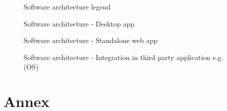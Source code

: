 \documentclass[letterpaper,10pt, openany,english]{sphinxmanual}
\begin{document}

\begin{figure}[htbp]
\centering
\capstart

\noindent{}
\caption{Software architecture legend}\label{\detokenize{architecture:linkage-architecture-legend}}\end{figure}

\begin{figure}[htbp]
\centering
\capstart

\noindent{}
\caption{Software architecture - Desktop app}\label{\detokenize{architecture:linkage-architecture}}\end{figure}

\begin{figure}[htbp]
\centering
\capstart

\noindent{}
\caption{Software architecture - Standalone web app}\label{\detokenize{architecture:linkage-architecture-spa}}\end{figure}

\begin{figure}[htbp]
\centering
\capstart

\noindent{}
\caption{Software architecture - Integration in third party application e.g.  (OS)}\label{\detokenize{architecture:linkage-architecture-os}}\end{figure}


\chapter{Annex}
\label{\detokenize{annex:annex}}\label{\detokenize{annex:sec-annex}}\label{\detokenize{annex::doc}}
\end{document}
